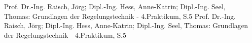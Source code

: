 


%     
%         

\begin{thebibliography}{999}
 Prof. Dr.-Ing. Raisch, Jörg; Dipl.-Ing. Hess, Anne-Katrin; Dipl.-Ing. Seel, Thomas:
Grundlagen der Regelungstechnik - 4.Praktikum, S.5
 Prof. Dr.-Ing. Raisch, Jörg; Dipl.-Ing. Hess, Anne-Katrin; Dipl.-Ing. Seel, Thomas:
Grundlagen der Regelungstechnik - 4.Praktikum, S.5

\end{thebibliography}



